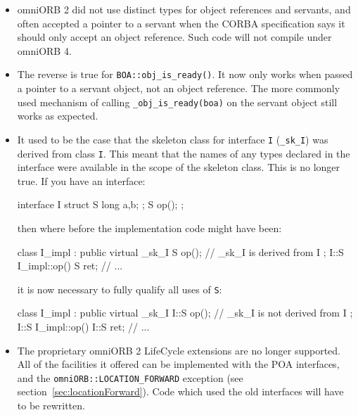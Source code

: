 \documentclass[11pt,twoside,a4paper]{book}
\newcommand{\type}[1]{\texttt{#1}}
\newcommand{\intf}[1]{\texttt{#1}}
\newcommand{\code}[1]{\texttt{#1}}
\newcommand{\op}[1]{\texttt{#1()}}
\begin{document}
\begin{itemize}

\item omniORB 2 did not use distinct types for object references and
servants, and often accepted a pointer to a servant when the CORBA
specification says it should only accept an object reference. Such
code will not compile under omniORB 4.

\item The reverse is true for \op{BOA::obj\_is\_ready}. It now only
works when passed a pointer to a servant object, not an object
reference. The more commonly used mechanism of calling
\code{\_obj\_is\_ready(boa)} on the servant object still works as
expected.

\item It used to be the case that the skeleton class for interface
\intf{I} (\type{\_sk\_I}) was derived from class \type{I}. This meant
that the names of any types declared in the interface were available
in the scope of the skeleton class. This is no longer true. If you
have an interface:

\begin{idllisting}
interface I {
  struct S {
    long a,b;
  };
  S op();
};
\end{idllisting}

\noindent then where before the implementation code might have been:

\begin{cxxlisting}
class I_impl : public virtual _sk_I {
  S op();  // _sk_I is derived from I
};
I::S I_impl::op() {
  S ret;
  // ...
}
\end{cxxlisting}

\noindent it is now necessary to fully qualify all uses of \type{S}:

\begin{cxxlisting}
class I_impl : public virtual _sk_I {
  I::S op(); // _sk_I is not derived from I
};
I::S I_impl::op() {
  I::S ret;
  // ...
}
\end{cxxlisting}


\item The proprietary omniORB 2 LifeCycle extensions are no longer
supported. All of the facilities it offered can be implemented with
the POA interfaces, and the \code{omniORB::LOCATION\_FORWARD}
exception (see section~\ref{sec:locationForward}). Code which used the
old interfaces will have to be rewritten.


\end{itemize}
\end{document}

